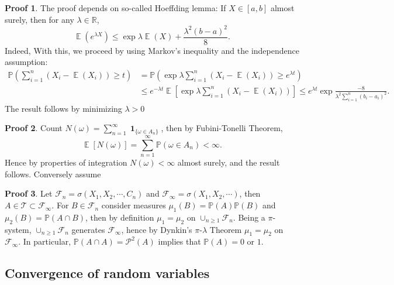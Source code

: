 \documentclass[hidelinks,11pt]{article}
\theoremstyle{definition}
\theoremstyle{dotless}
\newtheorem{prop}{Proof}[section]
\theoremstyle{remark}
\DeclareMathOperator{\E}{\mathbb{E}}
\DeclareMathOperator{\1}{\mathbf{1}}
\begin{document}
\begin{prop}
The proof depends on so-called Hoeffding lemma: If $X\in[a,b]$ almost surely, then for any $\lambda\in\mathbb{R}$,
\[\E(e^{\lambda X})\leq\exp{\lambda\E(X)+\frac{\lambda^2(b-a)^2}{8}}.\]
Indeed,\medbreak
With this, we proceed by using Markov's inequality and the independence assumption:
\begin{align*}
    \mathbb{P}\left(\sum_{i=1}^n(X_i-\E(X_i))\geq t\right)&=\mathbb{P}\left(\exp{\lambda\sum_{i=1}^n(X_i-\E(X_i))}\geq e^{\lambda t}\right)\\
    &\leq e^{-\lambda t}\E\left[\exp{\lambda\sum_{i=1}^n(X_i-\E(X_i))}\right]\leq e^{\lambda t}\exp{\frac{-8}{\lambda^2\sum_{i=1}^n(b_i-a_i)^2}}.
\end{align*}
The result follows by minimizing $\lambda>0$
\end{prop}

\begin{prop}
Count $N(\omega)=\sum_{n=1}^\infty\1_{\{\omega\in A_n\}}$, then by Fubini-Tonelli Theorem,
\[\E[N(\omega)]=\sum_{n=1}^\infty\mathbb{P}(\omega\in A_n)<\infty.\] Hence by properties of integration $N(\omega)<\infty$ almost surely, and the result follows.\medbreak
Conversely assume
\end{prop}

\begin{prop}
Let $\mathcal{F}_n=\sigma(X_1,X_2,\cdots,C_n)$ and $\mathcal{F}_\infty=\sigma(X_1,X_2,\cdots)$, then $A\in\mathcal{T}\subset\mathcal{F}_\infty$. For $B\in\mathcal{F}_n$ consider measures $\mu_1(B)=\mathbb{P}(A)\mathbb{P}(B)$ and $\mu_2(B)=\mathbb{P}(A\cap B)$, then by definition $\mu_1=\mu_2$ on $\cup_{n\geq1}\mathcal{F}_n$. Being a $\pi$-system, $\cup_{n\geq1}\mathcal{F}_n$ generates $\mathcal{F}_\infty$, hence by Dynkin's $\pi$-$\lambda$ Theorem $\mu_1=\mu_2$ on $\mathcal{F}_\infty$. In particular, $\mathbb{P}(A\cap A)=\mathcal{P}^2(A)$ implies that $\mathbb{P}(A)=0$ or $1$.
\end{prop}

\subsection{Convergence of random variables}
\end{document}
